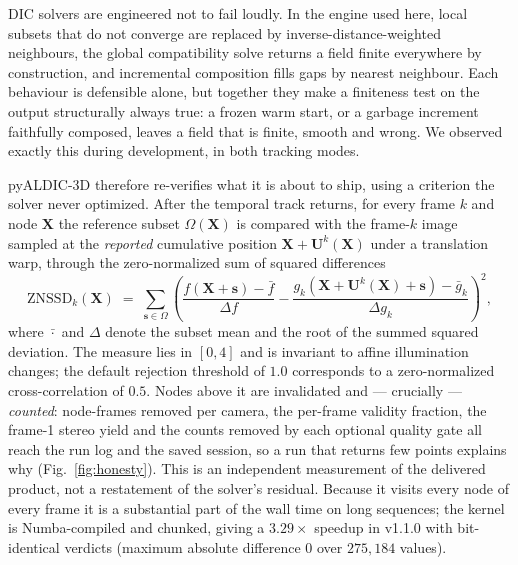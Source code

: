 DIC solvers are engineered not to fail loudly. In the engine used here, local subsets that do not converge are replaced by inverse-distance-weighted neighbours, the global compatibility solve returns a field finite everywhere by construction, and incremental composition fills gaps by nearest neighbour. Each behaviour is defensible alone, but together they make a finiteness test on the output structurally always true: a frozen warm start, or a garbage increment faithfully composed, leaves a field that is finite, smooth and wrong. We observed exactly this during development, in both tracking modes.

pyALDIC-3D therefore re-verifies what it is about to ship, using a criterion the solver never optimized. After the temporal track returns, for every frame $k$ and node $\mathbf{X}$ the reference subset $\Omega(\mathbf{X})$ is compared with the frame-$k$ image sampled at the \emph{reported} cumulative position $\mathbf{X}+\mathbf{U}^{k}(\mathbf{X})$ under a translation warp, through the zero-normalized sum of squared differences
%
\begin{equation}
\mathrm{ZNSSD}_k(\mathbf{X}) \;=\;
\sum_{\mathbf{s}\in\Omega}
\left(
\frac{f(\mathbf{X}+\mathbf{s})-\bar{f}}{\Delta f}
-
\frac{g_k(\mathbf{X}+\mathbf{U}^{k}(\mathbf{X})+\mathbf{s})-\bar{g}_k}{\Delta g_k}
\right)^{\!2},
\label{eq:znssd}
\end{equation}
%
where $\bar{\cdot}$ and $\Delta$ denote the subset mean and the root of the summed squared deviation. The measure lies in $[0,4]$ and is invariant to affine illumination changes; the default rejection threshold of $1.0$ corresponds to a zero-normalized cross-correlation of $0.5$. Nodes above it are invalidated and --- crucially --- \emph{counted}: node-frames removed per camera, the per-frame validity fraction, the frame-1 stereo yield and the counts removed by each optional quality gate all reach the run log and the saved session, so a run that returns few points explains why (Fig.~\ref{fig:honesty}). This is an independent measurement of the delivered product, not a restatement of the solver's residual. Because it visits every node of every frame it is a substantial part of the wall time on long sequences; the kernel is Numba-compiled and chunked, giving a $3.29\times$ speedup in v1.1.0 with bit-identical verdicts (maximum absolute difference $0$ over $275{,}184$ values).

